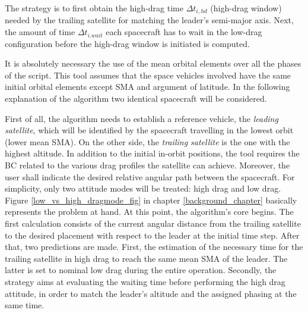 The strategy is to first obtain the high-drag time $\Delta t_{i,hd}$ (high-drag window) needed by the trailing satellite for matching the leader's semi-major axis.
Next, the amount of time $\Delta t_{i.wait}$ each spacecraft has to wait in the low-drag configuration before the high-drag window is initiated is computed.
\cite{foster2015orbit}













It is absolutely necessary the use of the mean orbital elements over all the phases of the script.
This tool assumes that the space vehicles involved have the same initial orbital elements except SMA and argument of latitude.  
In the following explanation of the algorithm two identical spacecraft will be considered.

First of all, the algorithm needs to establish a reference vehicle, the \textit{leading satellite}, which will be identified by the spacecraft travelling in the lowest orbit (lower mean SMA).
On the other side, the \textit{trailing satellite} is the one with the highest altitude.
In addition to the initial in-orbit positions, the tool requires the BC related to the various drag profiles the satellite can achieve.
Moreover, the user shall indicate the desired relative angular path between the spacecraft.
For simplicity, only two attitude modes will be treated: high drag and low drag.
Figure \ref{low_vs_high_dragmode_fig} in chapter \ref{background_chapter} basically represents the problem at hand.
At this point, the algorithm's core begins.
The first calculation consists of the current angular distance from the trailing satellite to the desired placement with respect to the leader at the initial time step.
After that, two predictions are made.
First, the estimation of the necessary time for the trailing satellite in high drag to reach the same mean SMA of the leader.
The latter is set to nominal low drag during the entire operation.
Secondly, the strategy aims at evaluating the waiting time before performing the high drag attitude, in order to match the leader's altitude and the assigned phasing at the same time.

